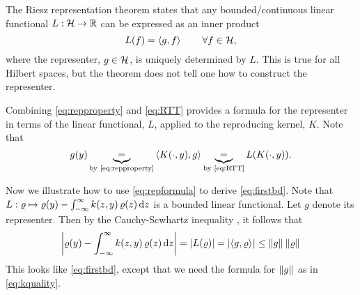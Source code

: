 \documentclass[letterpaper]{amsart}
\begin{document}
The Riesz representation theorem \cite{RieszWiki} states that any bounded/continuous linear functional $L:\mathcal{H} \to \mathbb{R}$ can be expressed as an inner product
\begin{equation}\label{eq:RTT}
L(f) = \left \langle g, f \right \rangle_{{}} \qquad \forall f \in \mathcal{H},
\end{equation}
where the representer, $g \in \mathcal{H}$, is uniquely determined by $L$.  This is true for all Hilbert spaces, but the theorem does not tell one how to construct the representer.

Combining \eqref{eq:repproperty} and \eqref{eq:RTT} provides a formula for the representer in terms of the linear functional, $L$, applied to the reproducing kernel, $K$.  Note that
\begin{equation} \label{eq:repformula}
    g(y) \underbrace{=}_{\text{by \eqref{eq:repproperty}}} \left \langle K(\cdot, y), g \right \rangle_{{}}
    \underbrace{=}_{\text{by \eqref{eq:RTT}}} L(K(\cdot,y)) .
\end{equation}

Now we illustrate how to use \eqref{eq:repformula} to derive \eqref{eq:firstbd}.  Note that $L: \varrho \mapsto \varrho(y) - \int_{-\infty}^{\infty} k(z,y) \, \varrho(z) \, {\rm d} z$ is a bounded linear functional.  Let $g$ denote its representer.  Then by the Cauchy-Scwhartz inequality \cite{CauchySchwarzWiki}, it follows that
\begin{equation}
    \left \lvert \varrho(y) - \int_{-\infty}^{\infty} k(z,y) \, \varrho(z) \, {\rm d} z \right \rvert = \left \lvert L(\varrho) \right \rvert = \left \lvert \left \langle g, \varrho \right \rangle_{{}} \right \rvert \le \left \lVert g \right \rVert_{{}}\left \lVert \varrho \right \rVert_{{}}
\end{equation}
This looks like  \eqref{eq:firstbd}, except that we need the formula for $\left \lVert g \right \rVert_{{}}$ as in \eqref{eq:kquality}.
\end{document}
